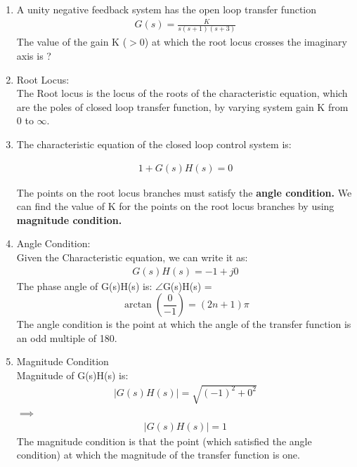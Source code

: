 \begin{enumerate}[label=\thesection.\arabic*.,ref=\thesection.\theenumi]
\item A unity negative feedback system has the open loop transfer function \\
\begin{align}
    G(s) = \frac{K}{s(s+1)(s+3)} 
    \label{eq:t1}
\end{align}
The value of the gain K ($>$0) at which the root locus crosses the imaginary axis is ?

\solution

\item Root Locus: \\
	  The Root locus is the locus of the roots of the characteristic equation, which are the poles of closed loop transfer function, by varying system gain K from $0$ to $\infty$.

\item The characteristic equation of the closed loop control system is: 

    \begin{align}
         1 + G(s)H(s) = 0    
    \end{align}
    
    The points on the root locus branches must satisfy the \textbf{angle condition.}
    We can find the value of K for the points on the root locus branches by using \textbf{magnitude condition.}

\item Angle Condition: \\
    Given the Characteristic equation, we can write it as:
    \begin{align}
         G(s)H(s) = -1 + j0   
    \end{align}
    The phase angle of G(s)H(s) is:
    $\angle$G(s)H(s) =\[ \arctan(\frac{0}{-1}) = (2n+1)\pi\]
    The angle condition is the point at which the angle of the transfer function is an odd multiple of 180.
   
\item Magnitude Condition \\

    Magnitude of G(s)H(s) is:
    \begin{align}
        |G(s)H(s)| = \sqrt{(-1)^2 + 0^2}
    \end{align}
    $\implies$
    \begin{align}
        |G(s)H(s)| =1 
    \end{align}
    The magnitude condition is that the point (which satisfied the angle condition) at which the magnitude of the transfer function is one.


\end{enumerate}
